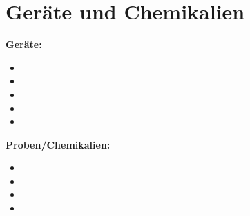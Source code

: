 \newpage
\section{Geräte und Chemikalien}
\label{sec:geraete}

\textbf{Geräte:}
\begin{itemize}
\item 
\item 
\item 
\item 
\item
\end{itemize}

\vspace*{5mm}

\textbf{Proben/Chemikalien:}
\begin{itemize}
\item 
\item 
\item 
\item 

\end{itemize}






